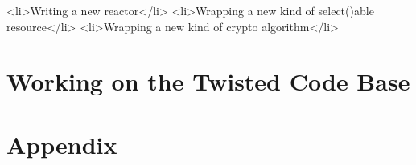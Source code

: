 \documentclass{book}
\begin{document}
    <li>Writing a new reactor</li>
    <li>Wrapping a new kind of select()able resource</li>
    <li>Wrapping a new kind of crypto algorithm</li>



\chapter{Working on the Twisted Code Base}






\chapter{Appendix}



\end{document}
